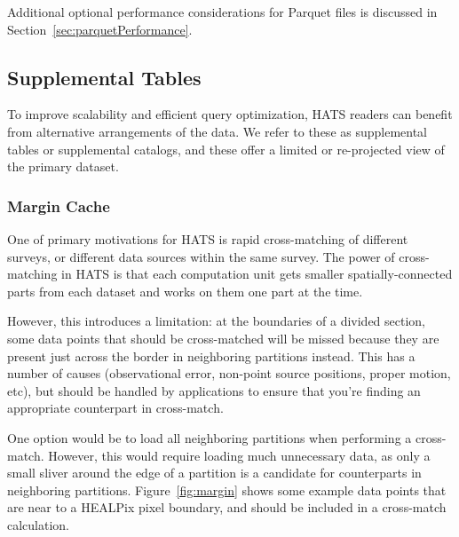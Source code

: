 \documentclass[11pt,a4paper]{ivoa}
\begin{document}
Additional optional performance considerations for Parquet files is discussed in Section~\ref{sec:parquetPerformance}.

\subsection{Supplemental Tables} \label{sec:supplemental}

To improve scalability and efficient query optimization, HATS readers can benefit from alternative arrangements of the data. 
We refer to these as supplemental tables or supplemental catalogs, and these offer a limited or re-projected view of the primary dataset.

\subsubsection{Margin Cache} \label{sec:margin}

One of primary motivations for HATS is rapid cross-matching of different surveys, or different data sources within the same survey. 
The power of cross-matching in HATS is that each computation unit gets smaller spatially-connected parts from each dataset and works on them one part at the time. \par 

However, this introduces a limitation: at the boundaries of a divided section, some data points that should be cross-matched will be missed because they are present just across the border in neighboring partitions instead.
This has a number of causes (observational error, non-point source positions, proper motion, etc), but should be handled by applications to ensure that you're finding an appropriate counterpart in cross-match.\par

One option would be to load all neighboring partitions when performing a cross-match. 
However, this would require loading much unnecessary data, as only a small sliver around the edge of a partition is a candidate for counterparts in neighboring partitions. 
Figure~\ref{fig:margin} shows some example data points that are near to a HEALPix pixel boundary, and should be included in a cross-match calculation.
\end{document}
